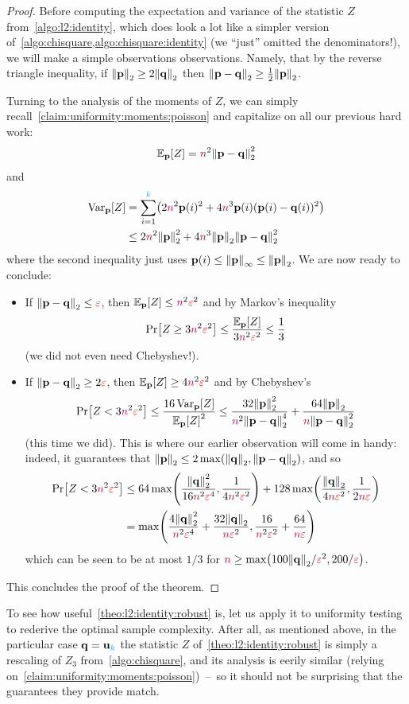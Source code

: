 \begin{proof}
Before computing the expectation and variance of the statistic $Z$ from~\cref{algo:l2:identity}, which does look a lot like a simpler version of~\cref{algo:chisquare,algo:chisquare:identity} (we ``just'' omitted the denominators!), we will make a simple observations observations. Namely, that by the reverse triangle inequality, if $\normtwo{\p} \geq 2\normtwo{\q}$ then $\normtwo{\p-\q} \geq \frac{1}{2}\normtwo{\p}$. 

Turning to the analysis of the moments of $Z$, we can simply recall~\cref{claim:uniformity:moments:poisson} and capitalize on all our previous hard work:
\begin{align}
	\bE{\p}{Z} = \ns^2 \normtwo{\p-\q}^2
\end{align}
and
\begin{align}
	\Var_{\p}[Z] &= \sum_{i=1}^\ab \Paren{ 2\ns^2 \p(i)^2 + 4\ns^3 \p(i)(\p(i)-\q(i))^2 } \notag \\
	&\leq 2\ns^2 \normtwo{\p}^2 + 4\ns^3 \normtwo{\p}\normtwo{\p-\q}^2
\end{align}
where the second inequality just uses $\p(i) \leq \norminf{\p} \leq \normtwo{\p}$. We are now ready to conclude:
\begin{itemize}
	\item If $\normtwo{\p-\q} \leq \dst$, then $\bE{\p}{Z} \leq \ns^2\dst^2$ and by Markov's inequality
	\[
		\bPr{Z \geq 3\ns^2\dst^2 } \leq \frac{\bE{\p}{Z}}{3\ns^2\dst^2} \leq \frac{1}{3}
	\]
	(we did not even need Chebyshev!).
	\item If $\normtwo{\p-\q} \geq 2\dst$, then $\bE{\p}{Z} \geq 4\ns^2\dst^2$ and by Chebyshev's 
	\[
		\bPr{Z < 3\ns^2\dst^2 } \leq \frac{16\Var_{\p}[Z]}{\bE{\p}{Z}^2} \leq 
		\frac{32\normtwo{\p}^2}{\ns^2\normtwo{\p-\q}^4} + \frac{64\normtwo{\p}}{\ns\normtwo{\p-\q}^2}
	\]
	(this time we did). This is where our earlier observation will come in handy: indeed, it guarantees that $\normtwo{\p} \leq 2\max\Paren{\normtwo{\q}, \normtwo{\p-\q}}$, and so
	\begin{align*}
		\bPr{Z < 3\ns^2\dst^2 } &\leq 
		64\max\Paren{\frac{\normtwo{\q}^2}{16\ns^2\dst^4},\frac{1}{4\ns^2\dst^2}} + 128\max\Paren{\frac{\normtwo{\q}}{4\ns\dst^2},\frac{1}{2\ns\dst}} \\
		&= \max\Paren{\frac{4\normtwo{\q}^2}{\ns^2\dst^4}+\frac{32\normtwo{\q}}{\ns\dst^2},\frac{16}{\ns^2\dst^2} + \frac{64}{\ns\dst}}
	\end{align*}
	which can be seen to be at most $1/3$ for $\ns \geq \max\Paren{100\normtwo{\q}/\dst^2, 200/\dst}$.
\end{itemize}
This concludes the proof of the theorem.
\end{proof}
To see how useful~\cref{theo:l2:identity:robust} is, let us apply it to uniformity testing to rederive the optimal sample complexity. After all, as mentioned above, in the particular case $\mathbf{q}=\mathbf{u}_{\textcolor{cyan}{k}}$ the statistic $Z$ of~\cref{theo:l2:identity:robust} is simply a rescaling of $Z_3$ from~\cref{algo:chisquare}, and its analysis is eerily similar (relying on~\cref{claim:uniformity:moments:poisson})~--~so it should not be surprising that the guarantees they provide match.

